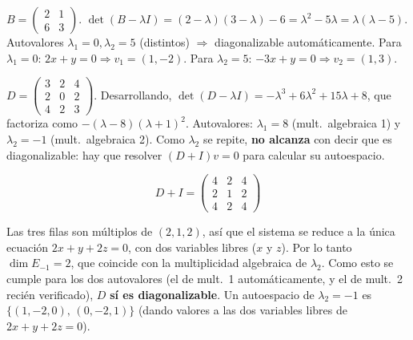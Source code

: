 \documentclass[11pt,a4paper]{article}
\begin{document}
\begin{ejemplo}
$B=\begin{pmatrix}2&1\\6&3\end{pmatrix}$. $\det(B-\lambda I)=(2-\lambda)(3-\lambda)-6=
\lambda^2-5\lambda=\lambda(\lambda-5)$. Autovalores $\lambda_1=0,\lambda_2=5$ (distintos)
$\Rightarrow$ diagonalizable automáticamente. Para $\lambda_1=0$: $2x+y=0\Rightarrow
v_1=(1,-2)$. Para $\lambda_2=5$: $-3x+y=0\Rightarrow v_2=(1,3)$.
\end{ejemplo}

\begin{ejemplo}
$D=\begin{pmatrix}3&2&4\\2&0&2\\4&2&3\end{pmatrix}$.
Desarrollando, $\det(D-\lambda I)=-\lambda^3+6\lambda^2+15\lambda+8$, que factoriza como
$-(\lambda-8)(\lambda+1)^2$. Autovalores: $\lambda_1=8$ (mult.\ algebraica 1) y
$\lambda_2=-1$ (mult.\ algebraica 2). Como $\lambda_2$ se repite, \textbf{no alcanza} con
decir que es diagonalizable: hay que resolver $(D+I)v=0$ para calcular su autoespacio.

\[
D+I=\begin{pmatrix}4&2&4\\2&1&2\\4&2&4\end{pmatrix}
\]

Las tres filas son múltiplos de $(2,1,2)$, así que el sistema se reduce a la única
ecuación $2x+y+2z=0$, con dos variables libres ($x$ y $z$). Por lo tanto
$\dim E_{-1}=2$, que coincide con la multiplicidad algebraica de $\lambda_2$. Como esto se
cumple para los dos autovalores (el de mult.\ 1 automáticamente, y el de mult.\ 2 recién
verificado), $D$ \textbf{sí es diagonalizable}. Un autoespacio de $\lambda_2=-1$ es
$\{(1,-2,0),\,(0,-2,1)\}$ (dando valores a las dos variables libres de $2x+y+2z=0$).
\end{ejemplo}
\end{document}
